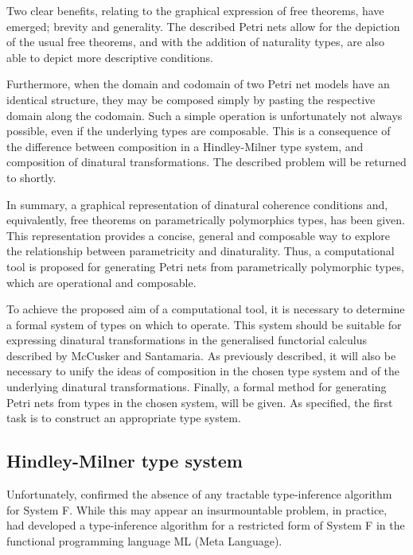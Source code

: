 \documentclass[../Dissertation.tex]{subfiles}
\begin{document}
Two clear benefits, relating to the graphical expression of free theorems, have emerged; brevity and generality. The described Petri nets allow for the depiction of the usual free theorems, and with the addition of naturality types, are also able to depict more descriptive conditions. 
\par
Furthermore, when the domain and codomain of two Petri net models have an identical structure, they may be composed simply by pasting the respective domain along the codomain. Such a simple operation is unfortunately not always possible, even if the underlying types are composable. This is a consequence of the difference between composition in a Hindley-Milner type system, and composition of dinatural transformations. The described problem will be returned to shortly.
\par
In summary, a graphical representation of dinatural coherence conditions and, equivalently, free theorems on parametrically polymorphics types, has been given. This representation provides  a concise, general and composable way to explore the relationship between parametricity and dinaturality. Thus, a computational tool is proposed for generating Petri nets from parametrically polymorphic types, which are operational and composable. 
\par
To achieve the proposed aim of a computational tool, it is necessary to determine a formal system of types on which to operate. This system should be suitable for expressing dinatural transformations in the generalised functorial calculus described by McCusker and Santamaria. As previously described, it will also be necessary to unify the ideas of composition in the chosen type system and of the underlying dinatural transformations. Finally, a formal method for generating Petri nets from types in the chosen system, will be given. As specified, the first task is to construct an appropriate type system.

\subsection{Hindley-Milner type system}\label{sec:HMType}
Unfortunately,  confirmed the absence of any tractable type-inference algorithm for System F. While this may appear an insurmountable problem, in practice,  had developed a type-inference algorithm for a restricted form of System F in the functional programming language ML (Meta Language).
\end{document}
